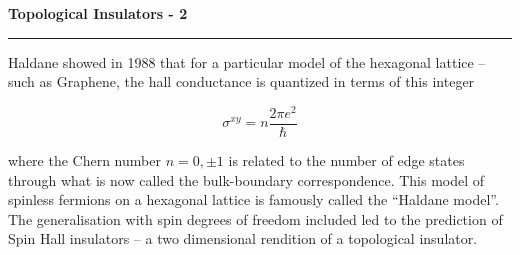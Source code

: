 \begin{frame}
	\begin{block}{\color{white}\textbf{\Large{
					Topological Insulators - 2
		}}}
		\vspace{-10pt}\rule{\textwidth}{0.5pt}
		\color{white}
		
		
	
		Haldane showed in 1988 that for a particular model of the hexagonal lattice -- such as Graphene, the hall conductance is quantized in terms of this integer
	
		
	\end{block}
	{\large
		\begin{equation*}
		\sigma^{xy} = n\frac{2\pi e^2}{\hbar}
	\end{equation*}
		
	}
	
		\begin{block}{}
				\color{white}
				
				where the Chern number $n=0,\pm1$ is related to the number of edge states through what is now called the bulk-boundary correspondence. This model of spinless fermions on a hexagonal lattice is famously called the ``Haldane model''. The generalisation with spin degrees of freedom included led to the prediction of Spin Hall insulators -- a two dimensional rendition of a topological insulator.  
				
			\end{block}
\end{frame}
